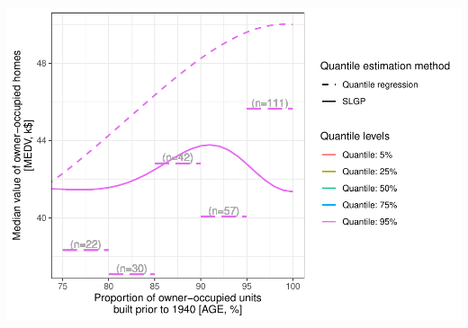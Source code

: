 \documentclass[
]{article}
\begin{document}
\includegraphics{IntroductionSLGP_files/figure-latex/unnamed-chunk-3-1.pdf}
\end{document}
